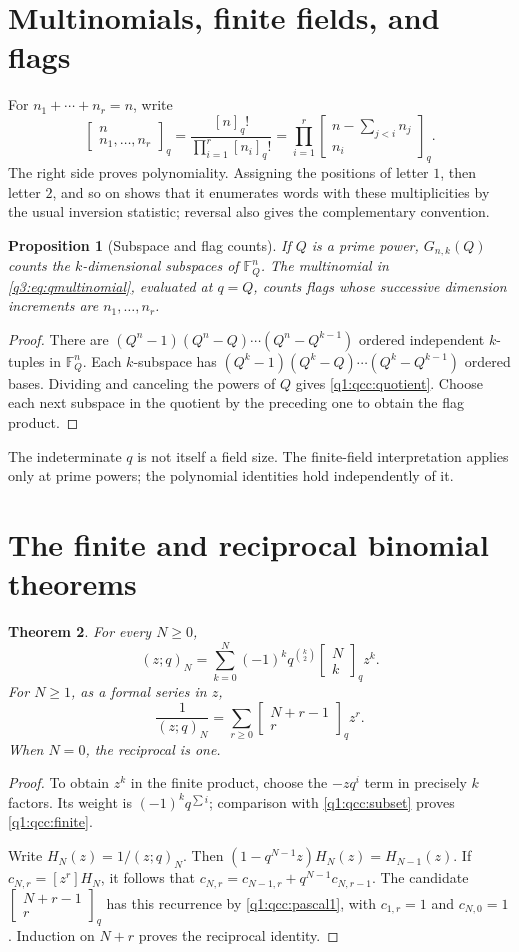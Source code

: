 \documentclass[11pt,a4paper,oneside,openany]{book}
\newtheorem{theorem}{Theorem}[chapter]
\newtheorem{proposition}[theorem]{Proposition}
\theoremstyle{definition}
\theoremstyle{remark}
\newcommand{\GB}[3][q]{\begin{bmatrix}#2\\#3\end{bmatrix}_{#1}}
\newcommand{\G}[2]{\GB{#1}{#2}}
\newcommand{\Gb}[3]{\GB[#3]{#1}{#2}}
\newcommand{\qfac}[1]{[#1]_q!}
\begin{document}
\section{Multinomials, finite fields, and flags}
For $n_1+\cdots+n_r=n$, write
\begin{equation}
 \Gb n{n_1,\ldots,n_r}q
 =\frac{\qfac n}{\prod_{i=1}^r\qfac{n_i}}
 =\prod_{i=1}^r\G{n-\sum_{j<i}n_j}{n_i}.
 \label{q3:eq:qmultinomial}
\end{equation}
The right side proves polynomiality. Assigning the positions of letter
$1$, then letter $2$, and so on shows that it enumerates words with these
multiplicities by the usual inversion statistic; reversal also gives the
complementary convention.

\begin{proposition}[Subspace and flag counts]
\label{q3:prop:flags}
If $Q$ is a prime power, $G_{n,k}(Q)$ counts the $k$-dimensional
subspaces of $\mathbb F_Q^n$. The multinomial in
\cref{q3:eq:qmultinomial}, evaluated at $q=Q$, counts flags whose successive
dimension increments are $n_1,\ldots,n_r$.
\end{proposition}
\begin{proof}
There are $(Q^n-1)(Q^n-Q)\cdots(Q^n-Q^{k-1})$ ordered independent
$k$-tuples in $\mathbb F_Q^n$. Each $k$-subspace has
$(Q^k-1)(Q^k-Q)\cdots(Q^k-Q^{k-1})$ ordered bases. Dividing and canceling
the powers of $Q$ gives \cref{q1:qcc:quotient}. Choose each next subspace
in the quotient by the preceding one to obtain the flag product.
\end{proof}
The indeterminate $q$ is not itself a field size. The finite-field
interpretation applies only at prime powers; the polynomial identities
hold independently of it.
\section{The finite and reciprocal binomial theorems}
\begin{theorem}\label{q1:qcc:finite-binomial}
For every \(N\ge0\),
\begin{equation}\label{q1:qcc:finite}
 (z;q)_N=\sum_{k=0}^N(-1)^kq^{\binom{k}{2}}\GB Nk z^k.
\end{equation}
For \(N\ge1\), as a formal series in \(z\),
\begin{equation}\label{q1:qcc:reciprocal}
 \frac1{(z;q)_N}=\sum_{r\ge0}\GB{N+r-1}r z^r.
\end{equation}
When \(N=0\), the reciprocal is one.
\end{theorem}
\begin{proof}
To obtain \(z^k\) in the finite product, choose the \(-zq^i\) term in precisely
\(k\) factors. Its weight is \((-1)^kq^{\sum i}\); comparison with
\eqref{q1:qcc:subset} proves \eqref{q1:qcc:finite}.

Write \(H_N(z)=1/(z;q)_N\). Then
\((1-q^{N-1}z)H_N(z)=H_{N-1}(z)\).
If \(c_{N,r}=[z^r]H_N\), it follows that
\(c_{N,r}=c_{N-1,r}+q^{N-1}c_{N,r-1}\).
The candidate \(\GB{N+r-1}r\) has this recurrence by
\eqref{q1:qcc:pascal1}, with \(c_{1,r}=1\) and \(c_{N,0}=1\).
Induction on \(N+r\) proves the reciprocal identity.
\end{proof}
\end{document}
